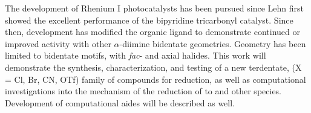 The development of Rhenium I photocatalysts has been pursued since Lehn first showed the excellent performance of the  bipyridine tricarbonyl catalyst. Since then, development has modified the organic ligand to demonstrate continued or improved activity with other $\alpha$-diimine bidentate geometries. Geometry has been limited to bidentate motifs, with \textit{fac}- and axial halides. This work will demonstrate the synthesis, characterization, and testing of a new terdentate,  (X = Cl, Br, CN, OTf) family of compounds for  reduction, as well as computational investigations into the mechanism of the reduction of  to  and other species. Development of computational aides will be described as well.

